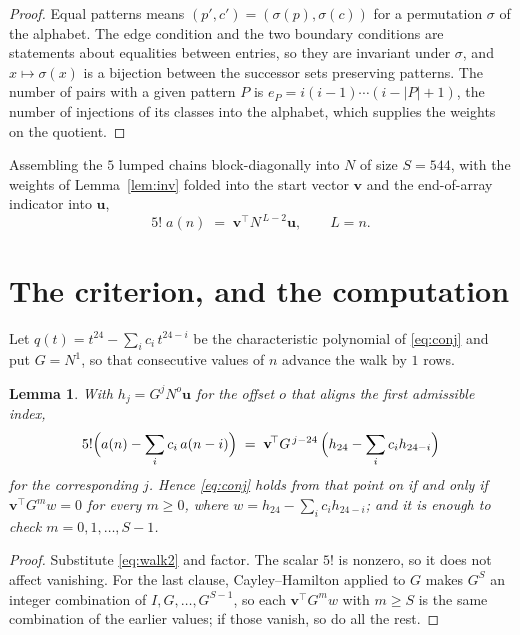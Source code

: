 \documentclass[11pt,a4paper]{article}
\theoremstyle{plain}
\newtheorem{lemma}[theorem]{Lemma}
\theoremstyle{definition}
\begin{document}
\begin{proof}
Equal patterns means $(p',c')=(\sigma(p),\sigma(c))$ for a permutation $\sigma$ of the
alphabet. The edge condition and the two boundary conditions are statements about equalities
between entries, so they are invariant under $\sigma$, and $x\mapsto\sigma(x)$ is a bijection
between the successor sets preserving patterns. The number of pairs with a given pattern $P$
is $e_P=i(i-1)\cdots(i-|P|+1)$, the number of injections of its classes into the alphabet,
which supplies the weights on the quotient.
\end{proof}

Assembling the $5$ lumped chains block-diagonally into $N$ of size $S=544$, with the
weights of Lemma~\ref{lem:inv} folded into the start vector $\mathbf{v}$ and the
end-of-array indicator into $\mathbf{u}$,
\begin{equation}\label{eq:walk2}
5!\;a(n)\;=\;\mathbf{v}^{\!\top}N^{\,L-2}\mathbf{u},\qquad L=n .
\end{equation}

\section{The criterion, and the computation}

Let $q(t)=t^{24}-\sum_i c_i\,t^{24-i}$ be the characteristic polynomial of
\eqref{eq:conj} and put $G=N^{1}$, so that consecutive values of $n$ advance the
walk by $1$ rows.

\begin{lemma}\label{lem:crit}
With $h_j=G^{j}N^{o}\mathbf{u}$ for the offset $o$ that aligns the first admissible
index,
\[
5!\Bigl(a(n)-\sum_i c_i\,a(n-i)\Bigr)\;=\;\mathbf{v}^{\!\top}G^{\,j-24}\,
\Bigl(h_{24}-\sum_i c_i h_{24-i}\Bigr)
\]
for the corresponding $j$. Hence \eqref{eq:conj} holds from that point on if and only if
$\mathbf{v}^{\!\top}G^{m}w=0$ for every $m\ge0$, where
$w=h_{24}-\sum_i c_ih_{24-i}$; and it is enough to check $m=0,1,\dots,S-1$.
\end{lemma}

\begin{proof}
Substitute \eqref{eq:walk2} and factor. The scalar $5!$ is nonzero, so it does not
affect vanishing. For the last clause, Cayley--Hamilton applied to $G$ makes $G^{S}$ an
integer combination of $I,G,\dots,G^{S-1}$, so each $\mathbf{v}^{\!\top}G^{m}w$ with
$m\ge S$ is the same combination of the earlier values; if those vanish, so do all the rest.
\end{proof}
\end{document}

